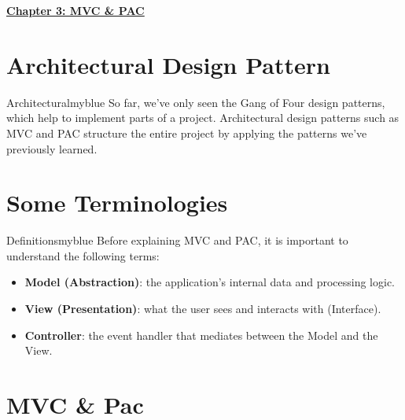 \newpage
\begin{center}
    \Huge{\textbf{\underline{Chapter 3: MVC \& PAC}}}
\end{center}

\setcounter{section}{0}

\vspace{0.3cm}


\section{Architectural Design Pattern}
\begin{prettyBox}{Architectural}{myblue}
So far, we’ve only seen the Gang of Four design patterns, which help to implement parts of a project.  
Architectural design patterns such as MVC and PAC structure the entire project by applying the patterns we’ve previously learned.
\end{prettyBox}

\vspace{0.2cm}

\section{Some Terminologies}
\begin{prettyBox}{Definitions}{myblue}
Before explaining MVC and PAC, it is important to understand the following terms:
\begin{itemize}
    \item \textbf{Model (Abstraction)}: the application’s internal data and processing logic.
    \item \textbf{View (Presentation)}: what the user sees and interacts with (Interface).
    \item \textbf{Controller}: the event handler that mediates between the Model and the View.
\end{itemize}
\end{prettyBox}

\vspace{0.2cm}
\section{MVC \& Pac}

